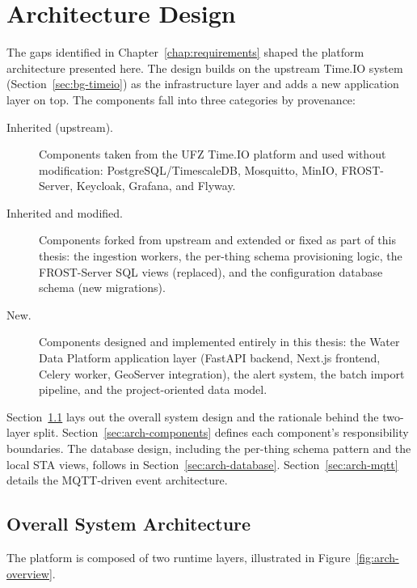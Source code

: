\chapter{Architecture Design}
\label{chap:architecture}

The gaps identified in Chapter~\ref{chap:requirements} shaped the platform architecture
presented here. The design builds on the upstream Time.IO system
(Section~\ref{sec:bg-timeio}) as the infrastructure layer and adds a new application
layer on top. The components fall into three categories by provenance:

\begin{description}
  \item[Inherited (upstream).] Components taken from the UFZ Time.IO platform and
    used without modification: PostgreSQL/TimescaleDB, Mosquitto, MinIO, FROST-Server,
    Keycloak, Grafana, and Flyway.
  \item[Inherited and modified.] Components forked from upstream and extended or fixed
    as part of this thesis: the ingestion workers, the per-thing schema provisioning
    logic, the FROST-Server SQL views (replaced), and the configuration database schema
    (new migrations).
  \item[New.] Components designed and implemented entirely in this thesis: the
    Water Data Platform application layer (FastAPI backend, Next.js frontend, Celery
    worker, GeoServer integration), the alert system, the batch import pipeline,
    and the project-oriented data model.
\end{description}

Section~\ref{sec:arch-overview} lays out the
overall system design and the rationale behind the two-layer split.
Section~\ref{sec:arch-components} defines each component's responsibility boundaries.
The database design, including the per-thing schema pattern and the local STA views,
follows in Section~\ref{sec:arch-database}. Section~\ref{sec:arch-mqtt} details the
MQTT-driven event architecture.

\section{Overall System Architecture}
\label{sec:arch-overview}

The platform is composed of two runtime layers, illustrated in
Figure~\ref{fig:arch-overview}.

